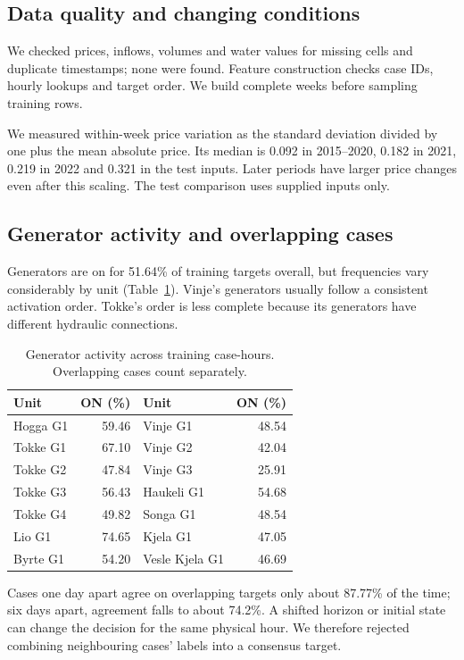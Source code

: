\documentclass[a4paper,11pt]{article}
\begin{document}
\subsection*{Data quality and changing conditions}
We checked prices, inflows, volumes and water values for missing cells and duplicate timestamps; none were found. Feature construction checks case IDs, hourly lookups and target order. We build complete weeks before sampling training rows.

We measured within-week price variation as the standard deviation divided by one plus the mean absolute price. Its median is 0.092 in 2015--2020, 0.182 in 2021, 0.219 in 2022 and 0.321 in the test inputs. Later periods have larger price changes even after this scaling. The test comparison uses supplied inputs only.

\subsection*{Generator activity and overlapping cases}
Generators are on for 51.64\% of training targets overall, but frequencies vary considerably by unit (Table~\ref{prevalence}). Vinje's generators usually follow a consistent activation order. Tokke's order is less complete because its generators have different hydraulic connections.

\begin{table}[ht]
\centering
\begin{tabular}{lr@{\qquad}lr}
\hline
Unit & ON (\%) & Unit & ON (\%)\\\hline
Hogga G1 & 59.46 & Vinje G1 & 48.54\\
Tokke G1 & 67.10 & Vinje G2 & 42.04\\
Tokke G2 & 47.84 & Vinje G3 & 25.91\\
Tokke G3 & 56.43 & Haukeli G1 & 54.68\\
Tokke G4 & 49.82 & Songa G1 & 48.54\\
Lio G1 & 74.65 & Kjela G1 & 47.05\\
Byrte G1 & 54.20 & Vesle Kjela G1 & 46.69\\\hline
\end{tabular}
\caption{Generator activity across training case-hours. Overlapping cases count separately.}\label{prevalence}
\end{table}

Cases one day apart agree on overlapping targets only about 87.77\% of the time; six days apart, agreement falls to about 74.2\%. A shifted horizon or initial state can change the decision for the same physical hour. We therefore rejected combining neighbouring cases' labels into a consensus target.
\end{document}
